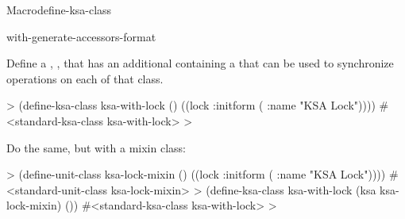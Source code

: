 \documentclass[10pt,twoside,english,pdftex]{article}
\begin{document}
\begin{functiondoc}{Macro}{define-ksa-class}
\classoptioninheritance

\begin{alsos}{with-generate-accessors-format}
\also[define-ks]
\end{alsos}

\fnexamples Define a , , that has
an additional  containing a  that can be used to
synchronize operations on each  of that class.
%
\W\supp
\begin{example}
  > (define-ksa-class ksa-with-lock ()
      ((lock :initform ( :name "KSA Lock"))))
  #<standard-ksa-class ksa-with-lock>
  >
\end{example}
%
Do the same, but with a mixin class:
%
\W\supp\notpretop
\begin{example}
  > (define-unit-class ksa-lock-mixin ()
      ((lock :initform ( :name "KSA Lock"))))
  #<standard-unit-class ksa-lock-mixin>
  > (define-ksa-class ksa-with-lock (ksa ksa-lock-mixin)
      ())
  #<standard-ksa-class ksa-with-lock>
  >
\end{example}

\end{functiondoc}

\end{document}
